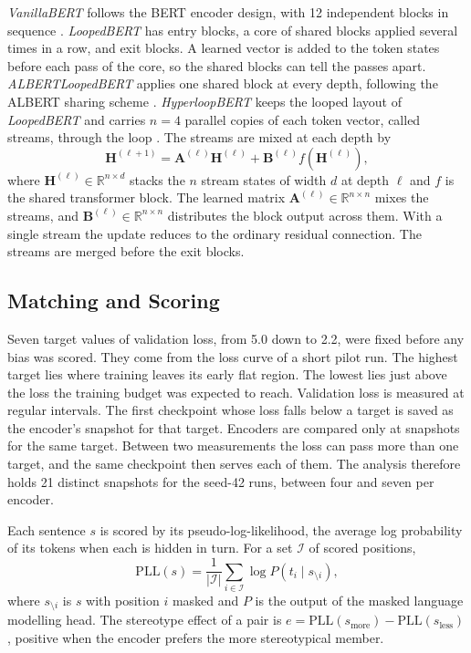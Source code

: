 \documentclass[sigconf,natbib=true]{acmart}
\begin{document}
\emph{VanillaBERT} follows the BERT encoder design, with 12 independent blocks in
sequence \citep{devlin2019bert}. \emph{LoopedBERT} has entry blocks, a core of
shared blocks applied several times in a row, and exit blocks. A learned vector
is added to the token states before each pass of the core, so the shared blocks
can tell the passes apart. \emph{ALBERTLoopedBERT} applies one shared block at
every depth, following the ALBERT sharing scheme \citep{lan2020albert}.
\emph{HyperloopBERT} keeps the looped layout of \emph{LoopedBERT} and carries
$n=4$ parallel copies of each token vector, called streams, through the loop
\citep{zeitoun2026hyperloop}. The streams are mixed at each depth by
%
\begin{equation}
\mathbf{H}^{(\ell+1)} = \mathbf{A}^{(\ell)}\mathbf{H}^{(\ell)}
                      + \mathbf{B}^{(\ell)} f\!\left(\mathbf{H}^{(\ell)}\right),
\end{equation}
%
where $\mathbf{H}^{(\ell)} \in \mathbb{R}^{n \times d}$ stacks the $n$ stream
states of width $d$ at depth $\ell$ and $f$ is the shared transformer block. The
learned matrix $\mathbf{A}^{(\ell)} \in \mathbb{R}^{n \times n}$ mixes the
streams, and $\mathbf{B}^{(\ell)} \in \mathbb{R}^{n \times n}$ distributes the
block output across them. With a single stream the update reduces to the
ordinary residual connection. The streams are merged before the exit blocks.

\subsection{Matching and Scoring}

Seven target values of validation loss, from 5.0 down to 2.2, were fixed before
any bias was scored. They come from the loss curve of a short pilot run. The
highest target lies where training leaves its early flat region. The lowest lies
just above the loss the training budget was expected to reach. Validation loss is
measured at regular intervals. The first checkpoint whose loss falls below a
target is saved as the encoder's snapshot for that target. Encoders are compared
only at snapshots for the same target. Between two measurements the
loss can pass more than one target, and the same checkpoint then serves each of
them. The analysis therefore holds 21 distinct snapshots for the seed-42 runs,
between four and seven per encoder.

Each sentence $s$ is scored by its pseudo-log-likelihood, the average log
probability of its tokens when each is hidden in turn. For a set $\mathcal{I}$ of
scored positions,
%
\begin{equation}
\mathrm{PLL}(s) = \frac{1}{|\mathcal{I}|}
                  \sum_{i \in \mathcal{I}} \log P\!\left(t_i \mid s_{\setminus i}\right),
\end{equation}
%
where $s_{\setminus i}$ is $s$ with position $i$ masked and $P$ is the output of
the masked language modelling head. The stereotype effect of a pair is
$e = \mathrm{PLL}(s_{\text{more}}) - \mathrm{PLL}(s_{\text{less}})$, positive
when the encoder prefers the more stereotypical member.
\end{document}
